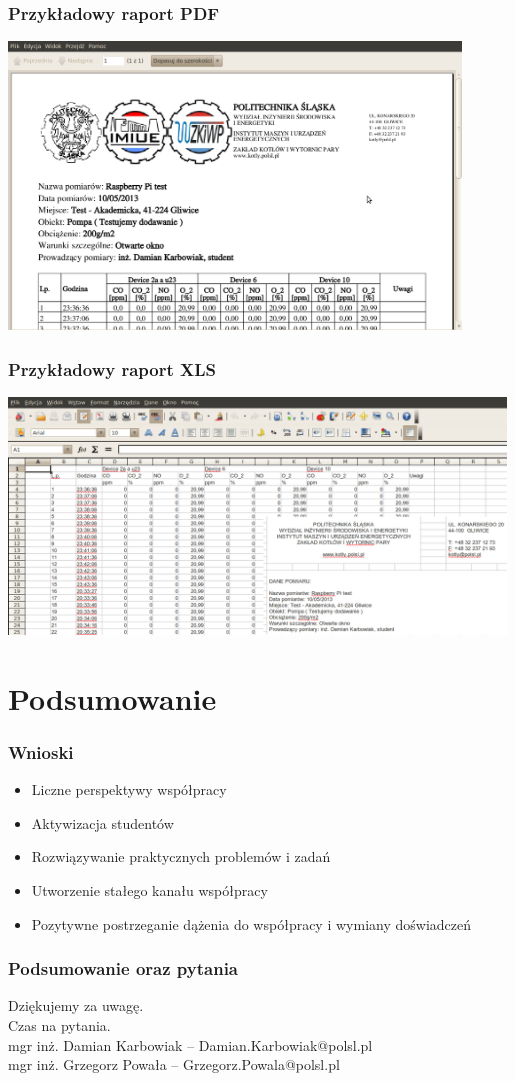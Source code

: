 \documentclass[ucs]{beamer}
\begin{document}
\begin{frame}
\frametitle{Przykładowy raport PDF}
\includegraphics[width=0.9\textwidth]{images/pdf}
\end{frame}

\begin{frame}
\frametitle{Przykładowy raport XLS}
\includegraphics[width=0.99\textwidth]{images/xls}
\end{frame}

\section{Podsumowanie}
\begin{frame}
\frametitle{Wnioski}
\begin{itemize}
\setlength{\itemsep}{5pt}
\setlength{\parskip}{5pt}
\setlength{\parsep}{5pt}
\item Liczne perspektywy współpracy
\item Aktywizacja studentów
\item Rozwiązywanie praktycznych problemów i zadań
\item Utworzenie stałego kanału współpracy 
\item Pozytywne postrzeganie dążenia do współpracy i wymiany doświadczeń
\end{itemize}
\end{frame}

\begin{frame}
\frametitle{Podsumowanie oraz pytania}
Dziękujemy za uwagę.
\\\vspace{2cm}
Czas na pytania.
\\\vspace{2cm}
mgr inż. Damian Karbowiak -- Damian.Karbowiak@polsl.pl\\
mgr inż. Grzegorz Powała -- Grzegorz.Powala@polsl.pl
\end{frame}
\end{document}
